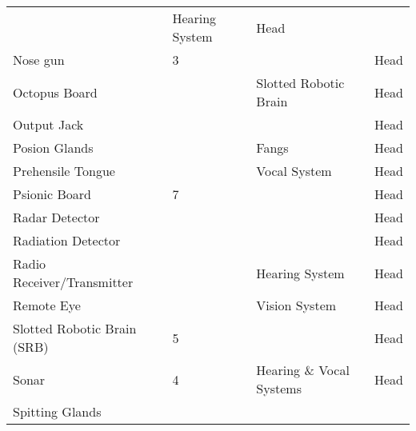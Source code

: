 \documentclass[twoside]{book}
\begin{document}
\begin{longtable}{p{1.25in}p{2em}ll}
  &
   Hearing System 
  &
   Head 
  \tabularnewline
      
  \raggedright
           Nose gun 
  &
   3 
  &
  
  &
   Head 
  \tabularnewline
      
  \raggedright
           Octopus Board 
  &
  
  &
   Slotted Robotic Brain
           
  &
   Head 
  \tabularnewline
      
  \raggedright
           Output Jack 
  &
  
  &
  
  &
   Head 
  \tabularnewline
      
  \raggedright
           Posion Glands 
  &
  
  &
   Fangs 
  &
   Head 
  \tabularnewline
      
  \raggedright
           Prehensile Tongue 
  &
  
  &
   Vocal System 
  &
   Head 
  \tabularnewline
      
  \raggedright
           Psionic Board 
  &
   7 
  &
  
  &
   Head 
  \tabularnewline
      
  \raggedright
           Radar Detector 
  &
  
  &
  
  &
   Head 
  \tabularnewline
      
  \raggedright
           Radiation Detector 
  &
  
  &
  
  &
   Head 
  \tabularnewline
      
  \raggedright
           Radio Receiver/Transmitter
           
  &
  
  &
   Hearing System 
  &
   Head 
  \tabularnewline
      
  \raggedright
           Remote Eye 
  &
  
  &
   Vision System 
  &
   Head 
  \tabularnewline
      
  \raggedright
           Slotted Robotic Brain (SRB)
           
  &
   5 
  &
  
  &
   Head 
  \tabularnewline
      
  \raggedright
           Sonar 
  &
   4 
  &
   Hearing \& Vocal
           Systems 
  &
   Head 
  \tabularnewline
      
  \raggedright
           Spitting Glands 
  &
  

\end{longtable}
\end{document}
